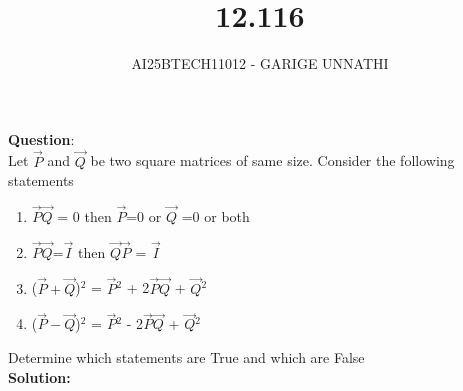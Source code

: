 \documentclass[journal]{IEEEtran}
\begin{document}



\title{12.116}
\author{AI25BTECH11012 - GARIGE UNNATHI}
{\let\newpage\relax\maketitle}


\renewcommand{\thefigure}{\theenumi}
\renewcommand{\thetable}{\theenumi}
\setlength{\intextsep}{10pt} %



\vspace{-1cm}

\textbf{Question}:\\
Let $\vec{P}$ and $\vec{Q}$ be two square matrices of same size. Consider the following statements
\begin{enumerate}
    \item $\vec{P}\vec{Q}$ = 0 then $\vec{P}$=0 or $\vec{Q}$ =0 or both
    \item $\vec{P}\vec{Q}$=$\vec{I}$ then $\vec{Q}\vec{P}$ = $\vec{I}$
    \item ($\vec{P}+\vec{Q}$)$^2$ = $\vec{P}$$^2$ + 2$\vec{P}\vec{Q}$ + $\vec{Q}$$^2$
    \item ($\vec{P}-\vec{Q}$)$^2$ = $\vec{P}$$^2$ - 2$\vec{P}\vec{Q}$ + $\vec{Q}$$^2$
\end{enumerate}
Determine which statements are True and which are False\\
\textbf{Solution:}\\
\end{document}
